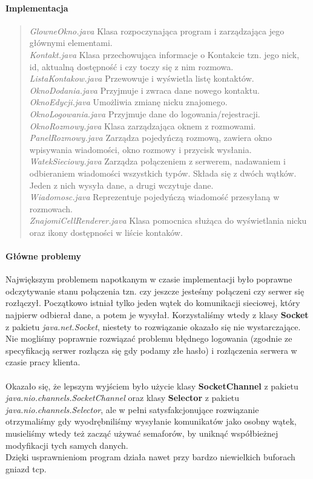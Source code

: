 \documentclass[10pt,a4paper]{article}
\begin{document}
	\paragraph{Implementacja}
	\begin{quote}
		\textit{GlowneOkno.java} Klasa rozpoczynająca program i zarządzająca jego głównymi elementami. \\
		\textit{Kontakt.java} Klasa przechowująca informacje o Kontakcie tzn. jego nick, id, aktualną dostępność i czy 
			toczy się z nim rozmowa.\\
		\textit{ListaKontakow.java} Przewowuje i wyświetla listę kontaktów. \\
		\textit{OknoDodania.java} Przyjmuje i zwraca dane nowego kontaktu. \\
		\textit{OknoEdycji.java} Umożliwia zmianę nicku znajomego. \\
		\textit{OknoLogowania.java} Przyjmuje dane do logowania/rejestracji. \\
		\textit{OknoRozmowy.java} Klasa zarządzająca oknem z rozmowami. \\
		\textit{PanelRozmowy.java} Zarządza pojedyńczą rozmową, zawiera okno wpisywania wiadomości, okno rozmowy i przycisk wysłania. \\
		\textit{WatekSieciowy.java} Zarządza połączeniem z serwerem, nadawaniem i odbieraniem wiadomości wszystkich typów.
			Składa się z dwóch wątków. Jeden z nich wysyła dane, a drugi wczytuje dane.\\
		\textit{Wiadomosc.java} Reprezentuje pojedyńczą wiadomość przesyłaną w rozmowach. \\
		\textit{ZnajomiCellRenderer.java} Klasa pomocnica służąca do wyświetlania nicku oraz ikony dostępności w liście kontaków. 
	\end{quote} 
	\paragraph{Główne problemy} Największym problemem napotkanym w czasie implementacji było poprawne odczytywanie stanu połączenia
		tzn. czy jeszcze jesteśmy połączeni czy serwer się rozłączył. Początkowo istniał tylko jeden wątek do komunikacji sieciowej, który
		najpierw odbierał dane, a potem je wysyłał. Korzystaliśmy wtedy z klasy \textbf{Socket} z pakietu \textit{java.net.Socket},
		niestety to rozwiązanie okazało się nie wystarczające. Nie mogliśmy poprawnie rozwiązać problemu błędnego logowania
		(zgodnie ze specyfikacją serwer rozłącza się gdy podamy złe hasło) i 
		rozłączenia serwera w czasie pracy klienta. \\ \\
		Okazało się, że lepszym wyjściem było użycie klasy \textbf{SocketChannel} z pakietu \textit{java.nio.channels.SocketChannel}
		oraz klasy \textbf{Selector} z pakietu \textit{java.nio.channels.Selector}, 
		ale w pełni satysfakcjonujące rozwiązanie otrzymaliśmy gdy wyodrębniliśmy wysyłanie komunikatów jako osobny wątek,
		musieliśmy wtedy też zacząć używać semaforów, by uniknąć współbieżnej modyfikacji tych samych danych.\\
		Dzięki usprawnieniom program działa nawet przy bardzo niewielkich buforach gniazd tcp.
\end{document}
